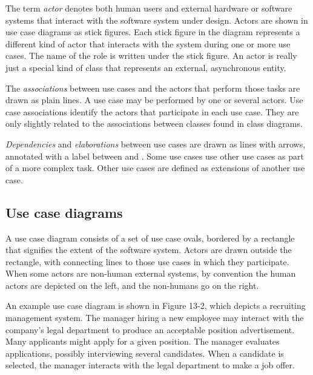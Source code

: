 The term \textit{actor} denotes both human users and
external hardware or software systems that interact with the software
system under design. Actors are shown in use case diagrams as stick
figures. Each stick figure in the diagram represents a different kind
of actor that interacts with the system during one or more use cases.
The name of the role is written under the stick figure. An
actor is really just a special kind of class that represents an
external, asynchronous entity.

The \textit{associations} between use cases
and the actors that perform those tasks are drawn as plain lines. A use
case may be performed by one or several
actors. Use case associations identify the actors that participate in
each use case. They are only slightly related to the associations
between classes found in class diagrams.

\textit{Dependencies} and \textit{elaborations} between use
cases are drawn as lines with arrows, annotated with a label between
\guillemotleft{ } and \guillemotright. Some use cases use other use cases as
part of a more complex task. Other use cases are defined as extensions of
another use case.

\subsection{Use case diagrams}

A use case diagram consists of a set of use case ovals, bordered by a rectangle
that signifies the extent of the software system. Actors are drawn outside the
rectangle, with connecting lines to those use cases in which they
participate. When some actors are non-human external systems, by convention the
human actors are depicted on the left, and the non-humans go on the right.

An example use case diagram is shown in Figure 13-2, which depicts a
recruiting management system. The manager hiring a new employee may
interact with the company's legal department to
produce an acceptable position advertisement. Many applicants might
apply for a given position. The manager evaluates applications,
possibly interviewing several candidates. When a candidate is selected,
the manager interacts with the legal department to make a job offer.

